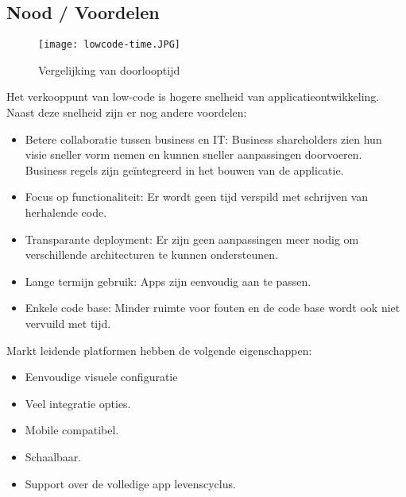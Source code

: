 \autocite{Richardson2016}

\subsection{Nood / Voordelen}

\begin{figure}[h!]
    \texttt{[image: lowcode-time.JPG]}
    \caption{Vergelijking van doorlooptijd \autocite{Richardson2016}}
    \label{fig:tijdverschil}
\end{figure}

Het verkooppunt van low-code is hogere snelheid van applicatieontwikkeling. Naast deze snelheid zijn er nog andere voordelen:
\begin{itemize}
    \item Betere collaboratie tussen business en IT: Business shareholders zien hun visie sneller vorm nemen en kunnen sneller aanpassingen doorvoeren. Business regels zijn geïntegreerd in het bouwen van de applicatie.
    \item Focus op functionaliteit: Er wordt geen tijd verspild met schrijven van herhalende code.
    \item Transparante deployment: Er zijn geen aanpassingen meer nodig om verschillende architecturen te kunnen ondersteunen.
    \item Lange termijn gebruik: Apps zijn eenvoudig aan te passen.
    \item Enkele code base: Minder ruimte voor fouten en de code base wordt ook niet vervuild met tijd.
\end{itemize} \autocite{Schetsen2016}

Markt leidende platformen hebben de volgende eigenschappen:
\begin{itemize}
    \item Eenvoudige visuele configuratie
    \item Veel integratie opties.
    \item Mobile compatibel.
    \item Schaalbaar.
    \item Support over de volledige app levenscyclus.
\end{itemize} \autocite{Kissflow2018}

